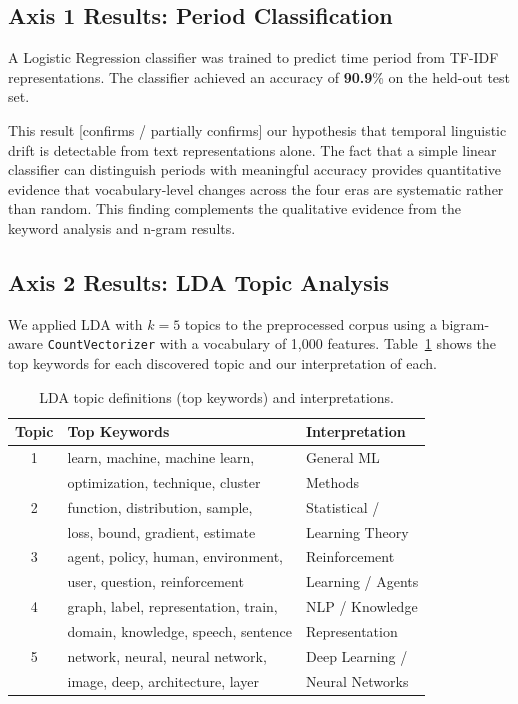 \documentclass{article}
\begin{document}
\subsection{Axis 1 Results: Period Classification}

A Logistic Regression classifier was trained to predict
time period from TF-IDF representations. The classifier
achieved an accuracy of \textbf{90.9}\%
on the held-out test set.

This result [confirms / partially confirms] our hypothesis
that temporal linguistic drift is detectable from text
representations alone. The fact that a simple linear
classifier can distinguish periods with meaningful accuracy
provides quantitative evidence that vocabulary-level
changes across the four eras are systematic rather than
random. This finding complements the qualitative evidence
from the keyword analysis and n-gram results.

\subsection{Axis 2 Results: LDA Topic Analysis}

We applied LDA with $k=5$ topics to the preprocessed corpus
using a bigram-aware \texttt{CountVectorizer} with a vocabulary
of 1,000 features. Table~\ref{tab:lda} shows the top keywords
for each discovered topic and our interpretation of each.

\begin{table}[H]
\centering
\small
\caption{LDA topic definitions (top keywords) and
         interpretations.}
\label{tab:lda}
\begin{tabular}{cll}
\toprule
\textbf{Topic} & \textbf{Top Keywords} & \textbf{Interpretation} \\
\midrule
1 & learn, machine, machine learn, & General ML \\
  & optimization, technique, cluster & Methods \\
2 & function, distribution, sample, & Statistical / \\
  & loss, bound, gradient, estimate & Learning Theory \\
3 & agent, policy, human, environment, & Reinforcement \\
  & user, question, reinforcement & Learning / Agents \\
4 & graph, label, representation, train, & NLP / Knowledge \\
  & domain, knowledge, speech, sentence & Representation \\
5 & network, neural, neural network, & Deep Learning / \\
  & image, deep, architecture, layer & Neural Networks \\
\bottomrule
\end{tabular}
\end{table}
\end{document}
